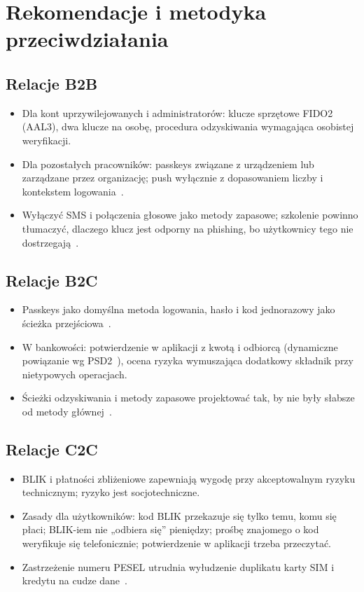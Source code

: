 \documentclass[11pt,a4paper]{article}
\begin{document}
\section{Rekomendacje i metodyka przeciwdziałania}\label{sec:rekomendacje}



\subsection{Relacje B2B}
\begin{itemize}
  \item Dla kont uprzywilejowanych i administratorów: klucze sprzętowe FIDO2 (AAL3), dwa klucze na osobę, procedura odzyskiwania wymagająca osobistej weryfikacji.
  \item Dla pozostałych pracowników: passkeys związane z urządzeniem lub zarządzane przez organizację; push wyłącznie z dopasowaniem liczby i kontekstem logowania~\cite{X5}.
  \item Wyłączyć SMS i połączenia głosowe jako metody zapasowe; szkolenie powinno tłumaczyć, dlaczego klucz jest odporny na phishing, bo użytkownicy tego nie dostrzegają~\cite{P3}.
\end{itemize}

\subsection{Relacje B2C}
\begin{itemize}
  \item Passkeys jako domyślna metoda logowania, hasło i kod jednorazowy jako ścieżka przejściowa~\cite{R2}.
  \item W bankowości: potwierdzenie w aplikacji z kwotą i odbiorcą (dynamiczne powiązanie wg PSD2~\cite{N3}), ocena ryzyka wymuszająca dodatkowy składnik przy nietypowych operacjach.
  \item Ścieżki odzyskiwania i metody zapasowe projektować tak, by nie były słabsze od metody głównej~\cite{P11}.
\end{itemize}

\subsection{Relacje C2C}
\begin{itemize}
  \item BLIK i płatności zbliżeniowe zapewniają wygodę przy akceptowalnym ryzyku technicznym; ryzyko jest socjotechniczne.
  \item Zasady dla użytkowników: kod BLIK przekazuje się tylko temu, komu się płaci; BLIK-iem nie „odbiera się” pieniędzy; prośbę znajomego o kod weryfikuje się telefonicznie; potwierdzenie w aplikacji trzeba przeczytać.
  \item Zastrzeżenie numeru PESEL utrudnia wyłudzenie duplikatu karty SIM i kredytu na cudze dane~\cite{X8}.
\end{itemize}
\end{document}
